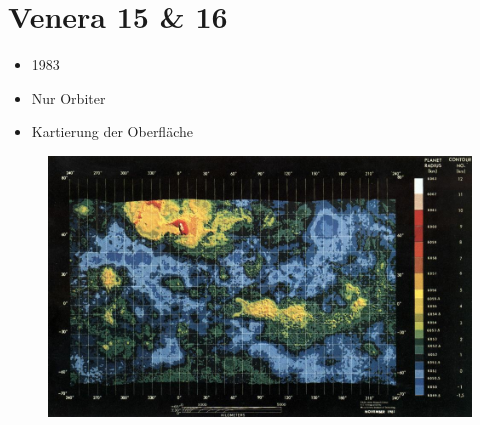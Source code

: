 \documentclass{beamer}
\begin{document}
	\section{Venera 15 \& 16}
	\begin{frame}
		\begin{itemize}
			\item 1983
			\item Nur Orbiter
			\item Kartierung der Oberfläche
		\end{itemize}
	\end{frame}
	\begin{frame}
		\begin{figure}
			\includegraphics[scale=.3]{./images/schlaues_bild}
		\end{figure}
	\end{frame}
\end{document}
